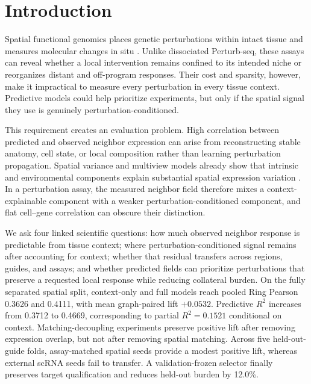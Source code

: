 \maketitle

\section{Introduction}
Spatial functional genomics places genetic perturbations within intact tissue
and measures molecular changes in situ
\citep{dhainaut2022spatialcrispr,binan2025perturbfish,shen2026spatialperturbseq}.
Unlike dissociated Perturb-seq, these assays can reveal whether a local
intervention remains confined to its intended niche or reorganizes distant and
off-program responses. Their cost and sparsity, however, make it impractical to
measure every perturbation in every tissue context. Predictive models could
help prioritize experiments, but only if the spatial signal they use is
genuinely perturbation-conditioned.

This requirement creates an evaluation problem. High correlation between
predicted and observed neighbor expression can arise from reconstructing stable
anatomy, cell state, or local composition rather than learning perturbation
propagation. Spatial variance and multiview models already show that intrinsic
and environmental components explain substantial spatial expression variation
\citep{arnol2019svca,tanevski2022misty,fischer2023ncem}. In a perturbation
assay, the measured neighbor field therefore mixes a context-explainable
component with a weaker perturbation-conditioned component, and flat
cell--gene correlation can obscure their distinction.

We ask four linked scientific questions: how much observed neighbor response is
predictable from tissue context; where perturbation-conditioned signal remains
after accounting for context; whether that residual transfers across regions,
guides, and assays; and whether predicted fields can prioritize perturbations
that preserve a requested local response while reducing collateral burden.
On the fully separated spatial split, context-only and full models reach pooled
Ring Pearson 0.3626 and 0.4111, with mean graph-paired lift $+0.0532$.
Predictive $R^2$ increases from 0.3712 to 0.4669, corresponding to partial
$R^2=0.1521$ conditional on context. Matching-decoupling experiments preserve
positive lift after removing expression overlap, but not after removing spatial
matching. Across five held-out-guide folds, assay-matched spatial seeds provide
a modest positive lift, whereas external scRNA seeds fail to transfer. A
validation-frozen selector finally preserves target qualification and reduces
held-out burden by 12.0\%.

